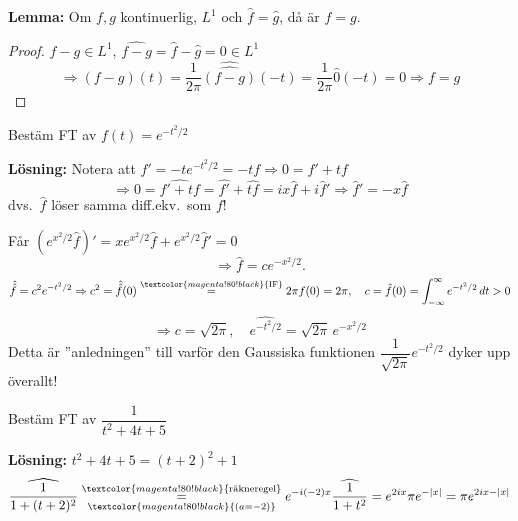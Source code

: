 \textbf{Lemma:} Om $f, g$ kontinuerlig, $L^1$ och $\hat{f} = \hat{g}$, då är $f = g$.
\begin{proof}
$f - g \in L^1$, $\widehat{f - g} = \hat{f} - \hat{g} = 0 \in L^1$
\[ \Rightarrow (f - g)(t) = \frac{1}{2\pi} \hat{\hat{(f - g)}}(-t) = \frac{1}{2\pi} \hat{0}(-t) = 0 \Rightarrow f = g \]
\end{proof}

\begin{example}
Bestäm FT av $f(t) = e^{-t^2/2}$

\textbf{Lösning:} Notera att $f' = -te^{-t^2/2} = -tf \Rightarrow 0 = f' + tf$
\[ \Rightarrow 0 = \widehat{f' + tf} = \widehat{f'} + \widehat{tf} = ix\hat{f} + i\hat{f}' \Rightarrow \hat{f}' = -x\hat{f} \]
dvs.\ $\hat{f}$ löser samma diff.ekv.\ som $f$!

Får $(e^{x^2/2}\hat{f})' = xe^{x^2/2}\hat{f} + e^{x^2/2}\hat{f}' = 0$
\[ \Longrightarrow \hat{f} = ce^{-x^2/2}. \]
\[ \hat{\hat{f}} = c^2 e^{-t^2/2} \Rightarrow c^2 = \hat{\hat{f}}(0) \overset{\textcolor{magenta!80!black}{\text{IF}}}{=} 2\pi f(0) = 2\pi, \quad c = \hat{f}(0) = \int_{-\infty}^\infty e^{-t^2/2}\,dt > 0 \]
\[ \Longrightarrow c = \sqrt{2\pi}, \quad \widehat{e^{-t^2/2}} = \sqrt{2\pi}\, e^{-x^2/2} \]
Detta är ''anledningen'' till varför den Gaussiska funktionen $\dfrac{1}{\sqrt{2\pi}} e^{-t^2/2}$ dyker upp överallt!
\end{example}

\begin{example}
Bestäm FT av $\dfrac{1}{t^2 + 4t + 5}$

\textbf{Lösning:} $t^2 + 4t + 5 = (t + 2)^2 + 1$
\[ \widehat{\frac{1}{1 + (t + 2)^2}} \underset{\textcolor{magenta!80!black}{(a = -2)}}{\overset{\textcolor{magenta!80!black}{\text{räkneregel}}}{=}} e^{-i(-2)x} \widehat{\frac{1}{1 + t^2}} = e^{2ix}\pi e^{-|x|} = \pi e^{2ix - |x|} \]
\end{example}
